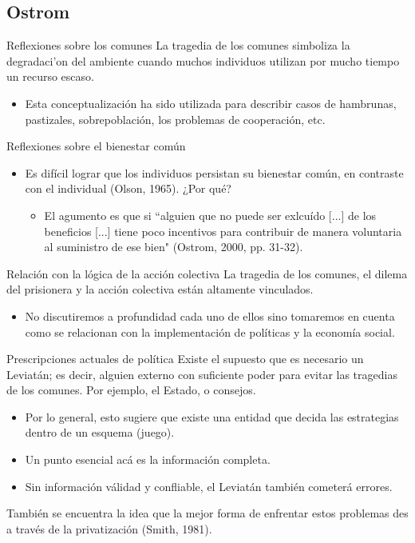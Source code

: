 \documentclass[11pt, aspectratio=169, compress]{beamer}
\begin{document}
\subsection{Ostrom}
\begin{frame}{Reflexiones sobre los comunes}
	La tragedia de los comunes simboliza la degradaci'on del ambiente cuando muchos individuos utilizan por mucho tiempo un recurso escaso. 
	\begin{itemize}
	\item Esta conceptualización ha sido utilizada para describir casos de hambrunas, pastizales, sobrepoblación, los problemas de cooperación, etc. 
	\end{itemize}
\end{frame}
\begin{frame}{Reflexiones sobre el bienestar común}
	\begin{itemize}
		\item Es difícil lograr que los individuos persistan su bienestar común, en contraste con el individual (Olson, 1965). ¿Por qué? 
	\begin{itemize}
		\item El agumento es que si ``alguien que no puede ser exlcuído [...] de los beneficios [...] tiene poco incentivos para contribuir de manera voluntaria al suministro de ese bien" (Ostrom, 2000, pp. 31-32). 
	\end{itemize}
	\end{itemize}
\end{frame}
\begin{frame}{Relación con la lógica de la acción colectiva}
La tragedia de los comunes, el dilema del prisionera y la acción colectiva están altamente vinculados. 
\begin{itemize}
	\item No discutiremos a profundidad cada uno de ellos sino tomaremos en cuenta como se relacionan con la implementación de políticas y la economía social. 
\end{itemize}
\end{frame}
\begin{frame}{Prescripciones actuales de política}
	Existe el supuesto que es necesario un Leviatán; es decir, alguien externo con suficiente poder para evitar las tragedias de los comunes. Por ejemplo, el Estado, o consejos.
	\begin{itemize}
		\item Por lo general, esto sugiere que existe una entidad que decida las estrategias dentro de un esquema (juego).
		\item Un punto esencial acá es la información completa.  
		\item Sin información válidad y confliable, el Leviatán también cometerá errores. 
	\end{itemize} 
	También se encuentra la idea que la mejor forma de enfrentar estos problemas des a través de la privatización (Smith, 1981). 
\end{frame}
\end{document}
